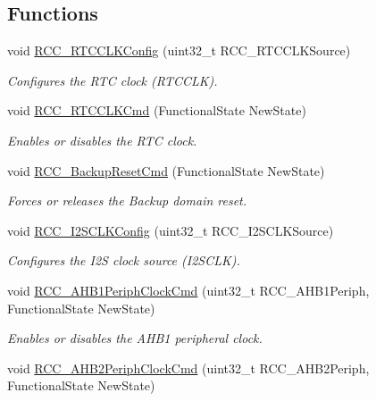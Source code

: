 \subsection*{Functions}
\begin{DoxyCompactItemize}
\item 
void \hyperlink{group___r_c_c___group3_ga1473d8a5a020642966359611c44181b0}{R\+C\+C\+\_\+\+R\+T\+C\+C\+L\+K\+Config} (uint32\+\_\+t R\+C\+C\+\_\+\+R\+T\+C\+C\+L\+K\+Source)
\begin{DoxyCompactList}\small\item\em Configures the R\+TC clock (R\+T\+C\+C\+LK). \end{DoxyCompactList}\item 
void \hyperlink{group___r_c_c___group3_ga9802f84846df2cea8e369234ed13b159}{R\+C\+C\+\_\+\+R\+T\+C\+C\+L\+K\+Cmd} (Functional\+State New\+State)
\begin{DoxyCompactList}\small\item\em Enables or disables the R\+TC clock. \end{DoxyCompactList}\item 
void \hyperlink{group___r_c_c___group3_ga636c3b72f35391e67f12a551b15fa54a}{R\+C\+C\+\_\+\+Backup\+Reset\+Cmd} (Functional\+State New\+State)
\begin{DoxyCompactList}\small\item\em Forces or releases the Backup domain reset. \end{DoxyCompactList}\item 
void \hyperlink{group___r_c_c___group3_ga6c56f8529988fcc8f4dbffbc1bab27d0}{R\+C\+C\+\_\+\+I2\+S\+C\+L\+K\+Config} (uint32\+\_\+t R\+C\+C\+\_\+\+I2\+S\+C\+L\+K\+Source)
\begin{DoxyCompactList}\small\item\em Configures the I2S clock source (I2\+S\+C\+LK). \end{DoxyCompactList}\item 
void \hyperlink{group___r_c_c___group3_ga80c89116820d48bb38db2e7d5e5a49b9}{R\+C\+C\+\_\+\+A\+H\+B1\+Periph\+Clock\+Cmd} (uint32\+\_\+t R\+C\+C\+\_\+\+A\+H\+B1\+Periph, Functional\+State New\+State)
\begin{DoxyCompactList}\small\item\em Enables or disables the A\+H\+B1 peripheral clock. \end{DoxyCompactList}\item 
void \hyperlink{group___r_c_c___group3_gaadffedbd87e796f01d9776b8ee01ff5e}{R\+C\+C\+\_\+\+A\+H\+B2\+Periph\+Clock\+Cmd} (uint32\+\_\+t R\+C\+C\+\_\+\+A\+H\+B2\+Periph, Functional\+State New\+State)

\end{DoxyCompactItemize}

